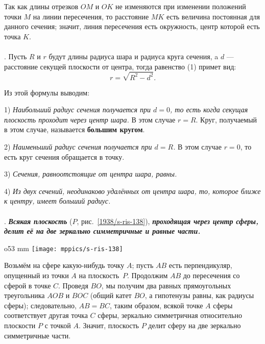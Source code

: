 Так как длины отрезков $OM$ и $OK$ не изменяются при изменении положений точки $M$ на линии пересечения, то расстояние $MK$ есть величина постоянная для данного сечения;
значит, линия пересечения есть окружность, центр которой есть точка $K$.

\paragraph{}\label{1938/s127}
.
Пусть $R$ и $r$ будут длины радиуса шара и радиуса круга сечения, a $d$ — расстояние секущей плоскости от центра, тогда равенство (1) примет вид: 
\[r= \sqrt{R^2 - d^2}.\]

Из этой формулы выводим:

1) \emph{Наибольший радиус сечения получается при $d=0$, то есть когда секущая плоскость проходит через центр шара.}
В этом случае $r=R$.
Круг, получаемый в этом случае, называется \textbf{большим кругом}.

2) \emph{Наименьший радиус сечения получается при $d=R$.}
В этом случае $r=0$, то есть круг сечения обращается в точку.

3) \emph{Сечения, равноотстоящие от центра шара, равны.}

4) \emph{Из двух сечений, неодинаково удалённых от центра шара, то, которое ближе к центру, имеет больший радиус.}

\paragraph{}\label{1938/s128}
.
\textbf{\emph{Всякая плоскость}} ($P$, рис.~\ref{1938/s-ris-138}), \textbf{\emph{проходящая через центр сферы, делит её на две зеркально симметричные и равные части.}}

\begin{wrapfigure}{o}{53 mm}
\vskip-0mm
\centering
\texttt{[image: mppics/s-ris-138]}
\caption{}\label{1938/s-ris-138}
\vskip-0mm
\end{wrapfigure}

Возьмём на сфере какую-нибудь точку $A$;
пусть $AB$ есть перпендикуляр, опущенный из точки $A$ на плоскость~$P$.
Продолжим $AB$ до пересечения со сферой в точке $C$.
Проведя $BO$, мы получим два равных прямоугольных треугольника $AOB$ и $BOC$ (общий катет $BO$, а гипотенузы равны, как радиусы сферы);
следовательно, $AB=BC$, таким образом, всякой точке $A$ сферы соответствует другая точка $C$ сферы, зеркально симметричная относительно плоскости $P$ с точкой $A$.
Значит, плоскость $P$ делит сферу на две зеркально симметричные части.

